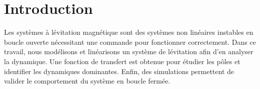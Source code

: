 \section{Introduction}
Les systèmes à lévitation magnétique sont des systèmes non linéaires instables en boucle ouverte nécessitant une commande pour fonctionner correctement.
Dans ce travail, nous modélisons et linéarisons un système de lévitation afin d’en analyser la dynamique.
Une fonction de transfert est obtenue pour étudier les pôles et identifier les dynamiques dominantes.
Enfin, des simulations permettent de valider le comportement du système en boucle fermée.\label{sec:intro}